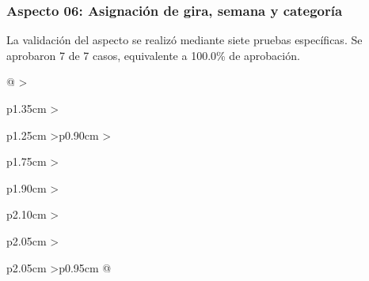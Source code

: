\subsubsection{Aspecto 06: Asignación de gira, semana y categoría}
La validación del aspecto se realizó mediante siete pruebas específicas. Se aprobaron 7 de 7 casos, equivalente a 100.0\% de aprobación.

\begingroup\fontsize{8}{10}\selectfont\renewcommand{\arraystretch}{1.25}\setlength{\tabcolsep}{2pt}
\begin{xltabular}{\linewidth}{@{}
>{\raggedright\arraybackslash}p{1.35cm}
>{\raggedright\arraybackslash}p{1.25cm}
>{\centering\arraybackslash}p{0.90cm}
>{\raggedright\arraybackslash}p{1.75cm}
>{\raggedright\arraybackslash}p{1.90cm}
>{\raggedright\arraybackslash}p{2.10cm}
>{\raggedright\arraybackslash}p{2.05cm}
>{\raggedright\arraybackslash}p{2.05cm}
>{\centering\arraybackslash}p{0.95cm}
@{}}


\end{xltabular}
